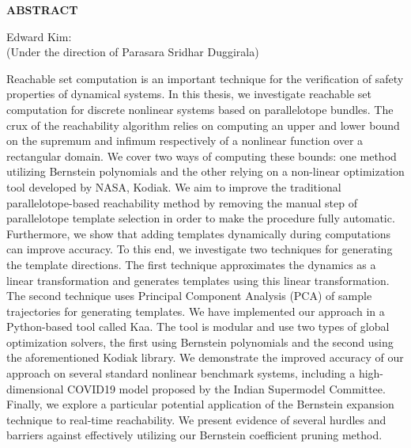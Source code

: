\begin{center}
\vspace*{52pt}
{\Large \textbf{ABSTRACT}}
\vspace{11pt}

\begin{singlespace}
Edward Kim: \thesistitle \\
(Under the direction of Parasara Sridhar Duggirala)
\end{singlespace}

\end{center}
\par Reachable set computation is an important technique for the verification of safety properties of dynamical systems.
%
%
In this thesis, we investigate reachable set computation for discrete nonlinear systems based on parallelotope bundles.
%
The crux of the reachability algorithm relies on computing an upper and lower bound on the supremum and infimum respectively of a nonlinear function over a rectangular domain.
%
We cover two ways of computing these bounds: one method utilizing Bernstein polynomials and the other relying on a non-linear optimization tool developed by NASA, Kodiak.
%
We aim to improve the traditional parallelotope-based reachability method by removing the manual step of parallelotope template selection in order to make the procedure fully automatic.
%
Furthermore, we show that adding templates dynamically during computations can improve accuracy.
%
%
%
To this end, we investigate two techniques for generating the template directions.
%
The first technique approximates the dynamics as a linear transformation and generates templates using this linear transformation.
%
The second technique uses Principal Component Analysis (PCA) of sample trajectories for generating templates.
%
We have implemented our approach in a Python-based tool called Kaa.
%
%
%
The tool is modular and use two types of global optimization solvers, the first using Bernstein polynomials and the second using
the aforementioned Kodiak library.
%
We demonstrate the improved accuracy of our approach on several standard nonlinear benchmark systems, including a high-dimensional COVID19 model proposed by the Indian Supermodel Committee.
%
Finally, we explore a particular potential application of the Bernstein expansion technique to real-time reachability.
%
We present evidence of several hurdles and barriers against effectively utilizing our Bernstein coefficient pruning method.
\clearpage
